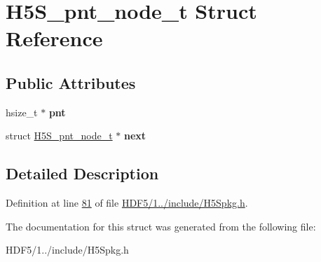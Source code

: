 \hypertarget{struct_h5_s__pnt__node__t}{}\section{H5\+S\+\_\+pnt\+\_\+node\+\_\+t Struct Reference}
\label{struct_h5_s__pnt__node__t}
\subsection*{Public Attributes}
\begin{DoxyCompactItemize}
\item 
\mbox{\label{struct_h5_s__pnt__node__t_a1ba132f66b780413634b01554e51395b}} 
hsize\+\_\+t $\ast$ {\bfseries pnt}
\item 
\mbox{\label{struct_h5_s__pnt__node__t_add9462e53eb7446505c7c22a48b2fea8}} 
struct \hyperlink{struct_h5_s__pnt__node__t}{H5\+S\+\_\+pnt\+\_\+node\+\_\+t} $\ast$ {\bfseries next}
\end{DoxyCompactItemize}


\subsection{Detailed Description}


Definition at line \hyperlink{_h_d_f5_21_810_81_2include_2_h5_spkg_8h_source_l00081}{81} of file \hyperlink{_h_d_f5_21_810_81_2include_2_h5_spkg_8h_source}{H\+D\+F5/1../include/\+H5\+Spkg.\+h}.



The documentation for this struct was generated from the following file\+:\begin{DoxyCompactItemize}
\item 
H\+D\+F5/1../include/\+H5\+Spkg.\+h\end{DoxyCompactItemize}
